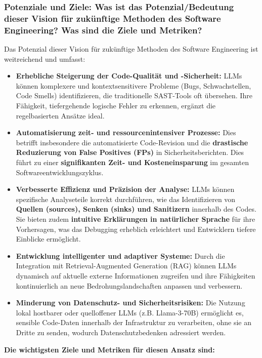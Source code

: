 \subsubsection*{Potenziale und Ziele: Was ist das Potenzial/Bedeutung dieser Vision für zukünftige Methoden des Software Engineering? Was sind die Ziele und Metriken?}

Das Potenzial dieser Vision für zukünftige Methoden des Software Engineering ist weitreichend und umfasst:

\begin{itemize}
    \item \textbf{Erhebliche Steigerung der Code-Qualität und -Sicherheit:} LLMs können komplexere und kontextsensitivere Probleme (Bugs, Schwachstellen, Code Smells) identifizieren, die traditionelle SAST-Tools oft übersehen. Ihre Fähigkeit, tiefergehende logische Fehler zu erkennen, ergänzt die regelbasierten Ansätze ideal.
    \item \textbf{Automatisierung zeit- und ressourcenintensiver Prozesse:} Dies betrifft insbesondere die automatisierte Code-Revision und die \textbf{drastische Reduzierung von False Positives (FPs)} in Sicherheitsberichten. Dies führt zu einer \textbf{signifikanten Zeit- und Kosteneinsparung} im gesamten Softwareentwicklungszyklus.
    \item \textbf{Verbesserte Effizienz und Präzision der Analyse:} LLMs können spezifische Analyseteile korrekt durchführen, wie das Identifizieren von \textbf{Quellen (sources), Senken (sinks) und Sanitizern} innerhalb des Codes. Sie bieten zudem \textbf{intuitive Erklärungen in natürlicher Sprache} für ihre Vorhersagen, was das Debugging erheblich erleichtert und Entwicklern tiefere Einblicke ermöglicht.
    \item \textbf{Entwicklung intelligenter und adaptiver Systeme:} Durch die Integration mit Retrieval-Augmented Generation (RAG) können LLMs dynamisch auf aktuelle externe Informationen zugreifen und ihre Fähigkeiten kontinuierlich an neue Bedrohungslandschaften anpassen und verbessern.
    \item \textbf{Minderung von Datenschutz- und Sicherheitsrisiken:} Die Nutzung lokal hostbarer oder quelloffener LLMs (z.B. Llama-3-70B) ermöglicht es, sensible Code-Daten innerhalb der Infrastruktur zu verarbeiten, ohne sie an Dritte zu senden, wodurch Datenschutzbedenken adressiert werden.
\end{itemize}

\textbf{Die wichtigsten Ziele und Metriken für diesen Ansatz sind:}

